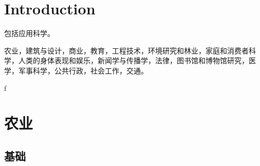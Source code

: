 

\chapter{Introduction}

包括应用科学。

农业，建筑与设计，商业，教育，工程技术，环境研究和林业，家庭和消费者科学，人类的身体表现和娱乐，新闻学与传播学，法律，图书馆和博物馆研究，医学，军事科学，公共行政，社会工作，交通。

f

\chapter{农业}

\section{基础}

